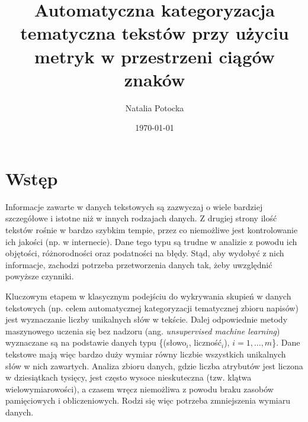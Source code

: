 \documentclass{praca1}
\author{Natalia Potocka}
\title{Automatyczna kategoryzacja tematyczna tekstów przy użyciu metryk w przestrzeni ciągów znaków}
\date{\today}
\begin{document}
%
%
%
%


  \tableofcontents

\chapter{Wstęp}



Informacje zawarte w danych tekstowych są zazwyczaj o wiele bardziej szczegółowe i istotne niż w innych rodzajach danych. Z drugiej strony ilość tekstów rośnie w bardzo szybkim tempie, przez co niemożliwe jest kontrolowanie ich jakości (np. w internecie). Dane tego typu są trudne w analizie z powodu ich objętości, różnorodności oraz podatności na błędy. Stąd, aby wydobyć z nich informacje, zachodzi potrzeba przetworzenia danych tak, żeby uwzględnić powyższe czynniki.

Kluczowym etapem w klasycznym podejściu do wykrywania skupień w danych tekstowych (np. celem automatycznej kategoryzacji tematycznej zbioru napisów) jest wyznaczanie liczby unikalnych słów w tekście. Dalej odpowiednie metody maszynowego uczenia się bez nadzoru (ang. \emph{unsupervised machine learning}) wyznaczane są na podstawie danych typu \{(słowo$_i$, liczność$_i$), $i=1,\ldots,m$\}. Dane tekstowe mają więc bardzo duży wymiar równy liczbie wszystkich unikalnych słów w nich zawartych. Analiza zbioru danych, gdzie liczba atrybutów jest liczona w dziesiątkach tysięcy, jest często wysoce nieskuteczna (tzw. klątwa wielowymiarowości), a czasem wręcz niemożliwa z powodu braku zasobów pamięciowych i obliczeniowych. Rodzi się więc potrzeba zmniejszenia wymiaru danych.
\end{document}
